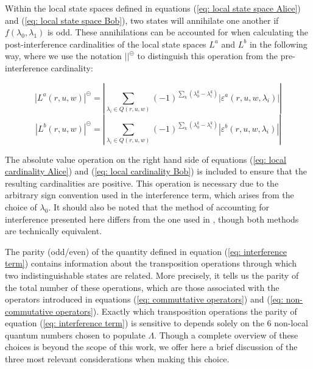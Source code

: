 \documentclass{article}
\begin{document}
 Within the local state spaces defined in equations (\ref{eq: local state space Alice}) and (\ref{eq: local state space Bob}), two states will annihilate one another if $f(\lambda_0,\lambda_1)$ is odd. These annihilations can be accounted for when calculating the post-interference cardinalities of the local state spaces $L^a$ and $L^b$ in the following way, where we use the notation $||^\circleddash$ to distinguish this operation from the pre-interference cardinality:

\begin{equation}
    |L^a(r,u,w)|^\circleddash=\left|\sum_{\lambda_i\in Q(r, u, w)}(-1)^{\sum_{k}(\lambda^k_0-\lambda^k_i)}|\varepsilon^a(r,u,w,\lambda_i)|\right|
    \label{eq: local cardinality Alice}
\end{equation}
\begin{equation}
    |L^b(r,u,w)|^\circleddash=\left|\sum_{\lambda_i\in Q(r, u, w)}(-1)^{\sum_{k}(\lambda^k_0-\lambda^k_i)}|\varepsilon^b(r,u,w,\lambda_i)|\right|
    \label{eq: local cardinality Bob}
\end{equation}

The absolute value operation on the right hand side of equations (\ref{eq: local cardinality Alice}) and (\ref{eq: local cardinality Bob}) is included to ensure that the resulting cardinalities are positive. This operation is necessary due to the arbitrary sign convention used in the interference term, which arises from the choice of $\lambda_0$. It should also be noted that the method of accounting for interference presented here differs from the one used in \cite{Powers2022, Powers2023}, though both methods are technically equivalent. 

The parity (odd/even) of the quantity defined in equation (\ref{eq: interference term}) contains information about the transposition operations through which two indistinguishable states are related. More precisely, it tells us the parity of the total number of these operations, which are those associated with the operators introduced in equations (\ref{eq: commuttative operators}) and (\ref{eq: non-commutative operators}). Exactly which transposition operations the parity of equation (\ref{eq: interference term}) is sensitive to depends solely on the 6 non-local quantum numbers chosen to populate $\Lambda$. Though a complete overview of these choices is beyond the scope of this work, we offer here a brief discussion of the three most relevant considerations when making this choice.
\end{document}
